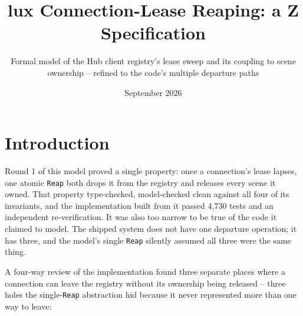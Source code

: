 \documentclass[a4paper,10pt,fleqn]{article}
\begin{document}
\title{lux Connection-Lease Reaping: a Z Specification}
\author{Formal model of the Hub client registry's lease sweep and its
  coupling to scene ownership -- refined to the code's multiple departure
  paths}
\date{September 2026}
\maketitle

\section{Introduction}

Round 1 of this model proved a single property: once a connection's lease
lapses, one atomic \texttt{Reap} both drops it from the registry and
releases every scene it owned. That property type-checked, model-checked
clean against all four of its invariants, and the implementation built
from it passed 4{,}730 tests and an independent re-verification. It was
also too narrow to be true of the code it claimed to model. The shipped
system does not have one departure operation; it has three, and the
model's single \texttt{Reap} silently assumed all three were the same
thing.

A four-way review of the implementation found three separate places where
a connection can leave the registry without its ownership being released
-- three holes the single-\texttt{Reap} abstraction hid because it never
represented more than one way to leave:
\end{document}
